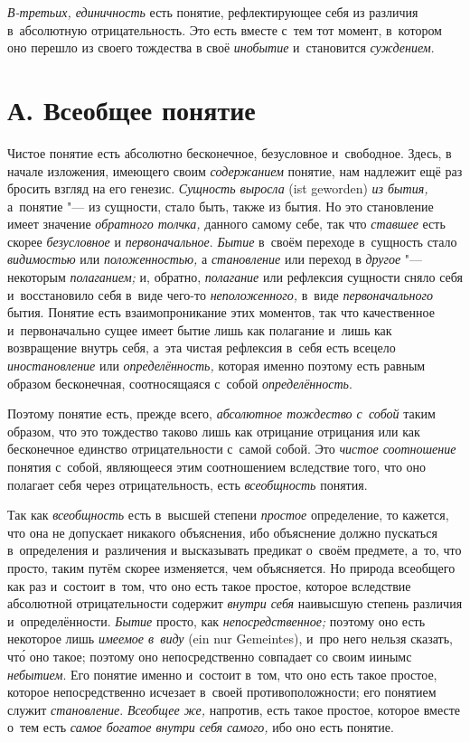 {\em В-третьих, единичность} есть
понятие, рефлектирующее себя из различия в~абсолютную отрицательность. Это
есть вместе с~тем тот момент, в~котором оно перешло из своего тождества в
своё {\em инобытие} и~становится {\em суждением}.

\section[А. Всеобщее понятие]{А. Всеобщее понятие}

Чистое понятие есть абсолютно бесконечное, безусловное и~свободное. Здесь,
в начале изложения, имеющего своим {\em содержанием} понятие, нам надлежит
ещё раз бросить взгляд на его генезис. {\em Сущность выросла} (ist geworden)
{\em из бытия,} а~понятие "--- из сущности, стало быть, также из бытия.
Но это становление имеет значение {\em обратного толчка,} данного самому себе,
так что {\em ставшее} есть скорее {\em безусловное} и {\em первоначальное}.
{\em Бытие} в~своём переходе в~сущность стало {\em видимостью} или
{\em положенностью,} а {\em становление} или переход
в {\em другое} "--- некоторым {\em полаганием;} и, обратно, {\em полагание}
или рефлексия сущности сняло себя и~восстановило себя в~виде чего-то
{\em неположенного,} в~виде {\em первоначального} бытия. Понятие есть
взаимопроникание этих моментов, так что качественное и~первоначально сущее
имеет бытие лишь как полагание и~лишь как возвращение внутрь себя, а~эта
чистая рефлексия в~себя есть всецело {\em иностановление} или
{\em определённость,} которая именно поэтому есть равным образом
бесконечная, соотносящаяся с~собой {\em определённость}.

Поэтому понятие есть, прежде всего, {\em абсолютное тождество с~собой}
таким образом, что это тождество таково лишь как отрицание
отрицания или как бесконечное единство отрицательности с~самой собой. Это
{\em чистое соотношение} понятия с~собой, являющееся этим соотношением
вследствие того, что оно полагает себя через отрицательность, есть
{\em всеобщность} понятия.

Так как {\em всеобщность} есть в~высшей степени {\em простое}
определение, то кажется, что она не допускает никакого
объяснения, ибо объяснение должно пускаться в~определения и~различения и
высказывать предикат о~своём предмете, а~то, что просто,
таким путём скорее изменяется, чем объясняется. Но природа
всеобщего как раз и~состоит в~том, что оно есть такое простое, которое
вследствие абсолютной отрицательности содержит {\em внутри себя}
наивысшую степень различия и~определённости. {\em Бытие} просто, как
{\em непосредственное;} поэтому оно есть некоторое лишь {\em имеемое в~виду}
(ein nur Gemeintes), и~про него нельзя сказать, чт\'{о} оно такое; поэтому
оно непосредственно совпадает со своим иинымс
{\em небытием}.
Его понятие именно и~состоит в~том, что оно есть такое
простое, которое непосредственно исчезает в~своей
противоположности; его понятием служит {\em становление}. {\em Всеобщее же,}
напротив, есть такое простое, которое вместе о~тем есть
{\em самое богатое внутри себя самого,} ибо оно есть понятие.

